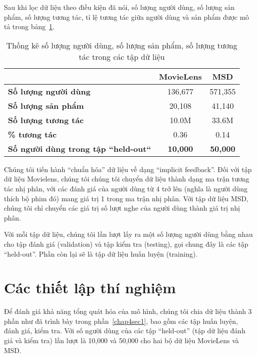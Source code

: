 Sau khi lọc dữ liệu theo điều kiện đã nói, số lượng người dùng, số lượng sản phẩm, số lượng tương tác, tỉ lệ tương tác giữa người dùng và sản phẩm được mô tả trong bảng~\ref{table_dataset}.
\begin{table}[]
\centering
    \begin{tabular}{|l|c|c|}
    \hline
                                                & \textbf{MovieLens} & \textbf{MSD}    \\ \hline
    \textbf{Số lượng người dùng}                  & 136,677            & 571,355         \\ \hline
    \textbf{Số lượng sản phẩm}                    & 20,108             & 41,140          \\ \hline
    \textbf{Số lượng tương tác}                   & 10.0M              & 33.6M           \\ \hline
    \textbf{\% tương tác}                         & 0.36               & 0.14            \\ \hline
    \textbf{Số người dùng trong tập ``held-out``} & \textbf{10,000}    & \textbf{50,000} \\ \hline
    \end{tabular}
    \label{table_dataset}
    \caption{Thống kê số lượng người dùng, số lượng sản phẩm, số lượng tương tác trong các tập dữ liệu}    
\end{table}


Chúng tôi tiến hành ``chuẩn hóa'' dữ liệu về dạng ``implicit feedback''. Đối với tập dữ liệu Movielens, chúng tôi 
chúng tôi chuyển dữ liệu thành dạng ma trận tương tác nhị phân, với các đánh giá của người dùng từ 4 trở lên (nghĩa là người dùng thích bộ phim đó) mang giá trị 1 trong ma trận nhị phân.
Với tập dữ liệu MSD, chúng tôi chỉ chuyển các giá trị số lượt nghe của người dùng thành giá trị nhị phân.

Với mỗi tập dữ liệu, chúng tôi lần lượt lấy ra một số lượng người dùng bằng nhau cho tập đánh giá (validation) và tập kiểm tra (testing), gọi chung đây là các tập ``held-out''. Phần còn lại sẽ là tập dữ liệu huấn luyện (training).


\section{Các thiết lập thí nghiệm}
\label{setup_experiment}

Để đánh giá khả năng tổng quát hóa của mô hình, chúng tôi chia dữ liệu thành 3 phần như đã trình bày trong phần~\ref{chap4sec1}, bao gồm các tập huấn luyện, đánh giá, kiểm tra. Với số người dùng của các tập ``held-out'' (tập dữ liệu đánh giá và kiểm tra) lần lượt là 10,000 và 50,000 cho hai bộ dữ liệu MovieLens và MSD.

